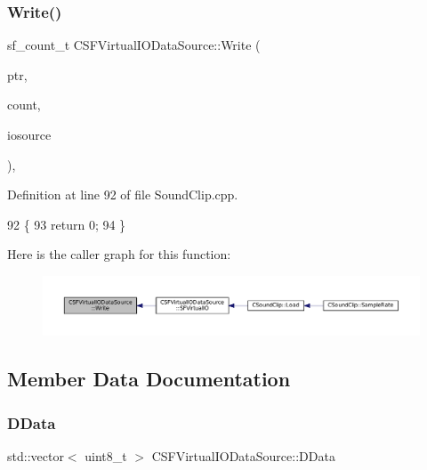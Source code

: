 \subsubsection{\texorpdfstring{Write()}{Write()}}
{\footnotesize\ttfamily sf\+\_\+count\+\_\+t C\+S\+F\+Virtual\+I\+O\+Data\+Source\+::\+Write (\begin{DoxyParamCaption}\item[{const void $\ast$}]{ptr,  }\item[{sf\+\_\+count\+\_\+t}]{count,  }\item[{\hyperlink{classCSFVirtualIODataSource}{C\+S\+F\+Virtual\+I\+O\+Data\+Source} $\ast$}]{iosource }\end{DoxyParamCaption})\hspace{0.3cm}{\ttfamily [static]}, {\ttfamily [protected]}}



Definition at line 92 of file Sound\+Clip.\+cpp.


\begin{DoxyCode}
92                                                                                                            
      \{
93     \textcolor{keywordflow}{return} 0;
94 \}
\end{DoxyCode}
Here is the caller graph for this function\+:
\nopagebreak
\begin{figure}[H]
\begin{center}
\leavevmode
\includegraphics[width=350pt]{classCSFVirtualIODataSource_ac1d38c4c9d8ba3e0a2affd7dd72283ee_icgraph}
\end{center}
\end{figure}


\subsection{Member Data Documentation}
\hypertarget{classCSFVirtualIODataSource_ac03be5c46b6647150e12edc04fa52ede}{}\label{classCSFVirtualIODataSource_ac03be5c46b6647150e12edc04fa52ede} 
\subsubsection{\texorpdfstring{D\+Data}{DData}}
{\footnotesize\ttfamily std\+::vector$<$ uint8\+\_\+t $>$ C\+S\+F\+Virtual\+I\+O\+Data\+Source\+::\+D\+Data\hspace{0.3cm}{\ttfamily [protected]}}



